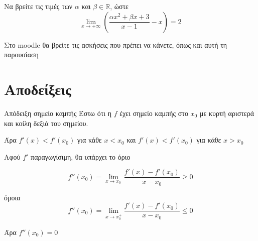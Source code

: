 \documentclass{presentation}
\begin{document}
\begin{askisi}
    Να βρείτε τις τιμές των $α$ και $β\in\mathbb{R}$, ώστε
    $$\lim\limits_{x \to +\infty}{ \left(   \dfrac{αx^2+βx+3}{x-1}-x \right)}=2$$

\end{askisi}

\begin{frame}
    Στο moodle θα βρείτε τις ασκήσεις που πρέπει να κάνετε, όπως και αυτή τη παρουσίαση
\end{frame}


\appendix

\section{Αποδείξεις}
\begin{frame}[label=Απόδειξη1]{Απόδειξη σημείο καμπής}
     Έστω ότι η $f$ έχει σημείο καμπής στο $x_0$ με κυρτή αριστερά και κοίλη δεξιά του σημείου.

    Άρα $f'(x)< f'(x_0)$ για κάθε $x<x_0$ και $f'(x)<f'(x_0)$ για κάθε $x>x_0$

     Αφού $f'$ παραγωγίσιμη, θα υπάρχει το όριο

    $$f''(x_0)=\lim\limits_{x \to x_0^-}{ \dfrac{f'(x)-f'(x_0)}{x-x_0} }\ge 0$$

     όμοια
    $$f''(x_0)=\lim\limits_{x \to x_0^+}{ \dfrac{f'(x)-f'(x_0)}{x-x_0} } \le 0$$

     Άρα $f''(x_0)=0$ \hyperlink{Θεώρημα1}{}
\end{frame}
\end{document}
